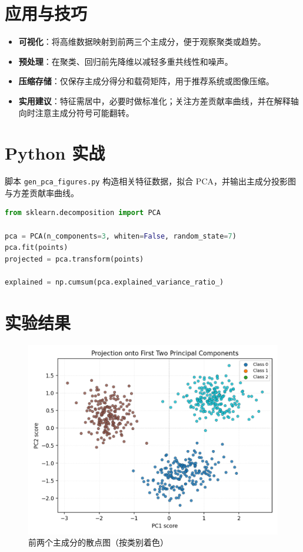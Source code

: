 \documentclass[UTF8,zihao=-4]{ctexart}
\begin{document}
\section{应用与技巧}
\begin{itemize}
  \item \textbf{可视化}：将高维数据映射到前两三个主成分，便于观察聚类或趋势。
  \item \textbf{预处理}：在聚类、回归前先降维以减轻多重共线性和噪声。
  \item \textbf{压缩存储}：仅保存主成分得分和载荷矩阵，用于推荐系统或图像压缩。
  \item \textbf{实用建议}：特征需居中，必要时做标准化；关注方差贡献率曲线，并在解释轴向时注意主成分符号可能翻转。
\end{itemize}

\section{Python 实战}
脚本 \texttt{gen\_pca\_figures.py} 构造相关特征数据，拟合 PCA，并输出主成分投影图与方差贡献率曲线。
\begin{lstlisting}[language=Python,caption={脚本 gen_pca_figures.py 片段}]
from sklearn.decomposition import PCA

pca = PCA(n_components=3, whiten=False, random_state=7)
pca.fit(points)
projected = pca.transform(points)

explained = np.cumsum(pca.explained_variance_ratio_)
\end{lstlisting}

\section{实验结果}
\begin{figure}[H]
  \centering
  \includegraphics[width=0.82\linewidth]{pca_projection.png}
  \caption{前两个主成分的散点图（按类别着色）}
  \label{fig:pca_projection_cn}
\end{figure}
\end{document}
